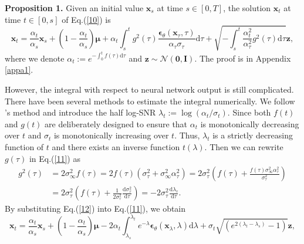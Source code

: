 \textbf{Proposition 1.} Given an initial value $\boldsymbol{x}_s$ at time $s\in[0,T]$, the solution $\boldsymbol{x}_t$ at time $t\in[0,s]$ of Eq.(\ref{10}) is 
\begin{equation}
    \boldsymbol{x}_t=\frac{\alpha_t}{\alpha_s}\boldsymbol{x}_s
    +\left(1-\frac{\alpha_t}{\alpha_s}\right)\boldsymbol{\mu}+\alpha_t\int_s^tg^2(\tau)\frac{\boldsymbol{\epsilon}_\theta(\boldsymbol{x}_\tau,\tau)}{\alpha_{\tau}\sigma_{\tau}}\mathrm{d}\tau
    +\sqrt{-\int_s^t\frac{\alpha_t^2}{\alpha_\tau^2}g^2(\tau)\mathrm{d}\tau}\boldsymbol{z},
    \label{11}
\end{equation}
where we denote $\alpha_t:=e^{-\int_0^tf(\tau)\mathrm{d}\tau}$ and $\boldsymbol{z}\sim \mathcal{N}(\boldsymbol{0},\boldsymbol{I})$. The proof is in Appendix \ref{appa1}.

However, the integral with respect to neural network output is still complicated. There have been several methods \citep{lu2022dpmsolver,zhang2022deis,zhao2024unipc} to estimate the integral numerically. We follow \cite{lu2022dpmsolverplus}'s method and introduce the half log-SNR $\lambda_t:=\log({\alpha_t/\sigma_t})$. Since both $f(t)$ and $g(t)$ are deliberately designed to ensure that $\alpha_t$ is monotonically decreasing over $t$ and $\sigma_t$ is monotonically increasing over $t$. Thus, $\lambda_t$ is a strictly decreasing function of $t$ and there exists an inverse function $t(\lambda)$. Then we can rewrite $g(\tau)$ in Eq.(\ref{11}) as
\begin{equation}
\begin{aligned}
g^2(\tau)&=2\sigma_\infty^2f(\tau)
=2f(\tau)(\sigma^2_{\tau}+\sigma_\infty^2\alpha_\tau^2)
=2\sigma^2_{\tau}(f(\tau)+\frac{f(\tau)\sigma_\infty^2\alpha_\tau^2}{\sigma^2_{\tau}})\\
&=2\sigma^2_{\tau}(f(\tau)+\frac{1}{2\sigma^2_{\tau}}\frac{\mathrm{d}\sigma^2_{\tau}}{\mathrm{d}\tau})
=-2\sigma^2_{\tau}\frac{\mathrm{d}\lambda_\tau}{\mathrm{d}\tau}.
\label{12}
\end{aligned}
\end{equation}
By substituting Eq.(\ref{12}) into Eq.(\ref{11}), we obtain
\begin{equation}
    \boldsymbol{x}_t=\frac{\alpha_t}{\alpha_s}\boldsymbol{x}_s
    +\left(1-\frac{\alpha_t}{\alpha_s}\right)\boldsymbol{\mu}-2\alpha_t\int_{\lambda_s}^{\lambda_t}e^{-\lambda}\boldsymbol{\epsilon}_\theta(\boldsymbol{x}_\lambda,\lambda)\mathrm{d}\lambda +\sigma_t\sqrt{(e^{2(\lambda_t-\lambda_s)}-1)}\boldsymbol{z},
\label{13}
\end{equation}
